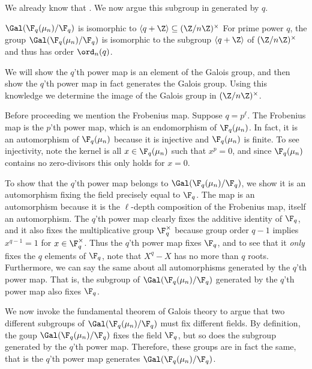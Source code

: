 We already know that .
We now argue this subgroup in generated by $q$.

\begin{theorem}{$\Gal(\F_q(\mu_n)/\F_q)$ is isomorphic to $\langle q+\Z\rangle\subseteq(\Z/n\Z)^\times$}
    For prime power $q$, the group $\Gal(\F_q(\mu_n)/\F_q)$ is isomorphic to the subgroup $\langle q+\Z\rangle$ of $(\Z/n\Z)^\times$ and thus has order $\ord_n(q)$.

    \proof
    We will show the $q$'th power map is an element of the Galois group, and then show the $q$'th power map in fact generates the Galois group.
    Using this knowledge we determine the image of the Galois group in $(\Z/n\Z)^\times$.

    Before proceeding we mention the Frobenius map.
    Suppose $q=p^\ell$.
    The Frobenius map is the $p$'th power map, which is an endomorphism of $\F_q(\mu_n)$.
    In fact, it is an automorphism of $\F_q(\mu_n)$ because it is injective and $\F_q(\mu_n)$ is finite.
    To see injectivity, note the kernel is all $x\in\F_q(\mu_n)$ such that $x^p=0$, and since $\F_q(\mu_n)$ contains no zero-divisors this only holds for $x=0$.

    To show that the $q$'th power map belongs to $\Gal(\F_q(\mu_n)/\F_q)$, we show it is an automorphism fixing the field precisely equal to $\F_q$.
    The map is an automorphism because it is the $\ell$-depth composition of the Frobenius map, itself an automorphism.
    The $q$'th power map clearly fixes the additive identity of $\F_q$, and it also fixes the multiplicative group $\F_q^\times$ because group order $q-1$ implies $x^{q-1}=1$ for $x\in\F_q^\times$.
    Thus the $q$'th power map fixes $\F_q$, and to see that it \emph{only} fixes the $q$ elements of $\F_q$, note that $X^q-X$ has no more than $q$ roots.
    Furthermore, we can say the same about all automorphisms generated by the $q$'th power map. 
    That is, the subgroup of $\Gal(\F_q(\mu_n)/\F_q)$ generated by the $q$'th power map also fixes $\F_q$.

    We now invoke the fundamental theorem of Galois theory to argue that two different subgroups of $\Gal(\F_q(\mu_n)/\F_q)$ must fix different fields.
    By definition, the goup $\Gal(\F_q(\mu_n)/\F_q)$ fixes the field $\F_q$, but so does the subgroup generated by the $q$'th power map.
    Therefore, these groups are in fact the same, that is the $q$'th power map generates $\Gal(\F_q(\mu_n)/\F_q)$.


\end{theorem}

